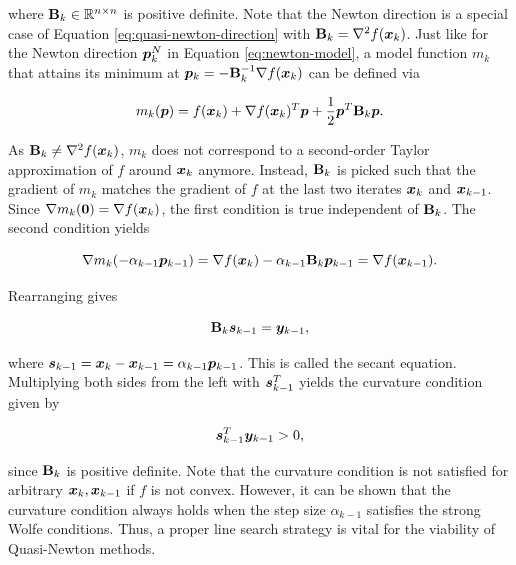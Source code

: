 \noindent where $\mathbf{B}_k \in \mathbb{R}^{n \times n}$ is positive definite. Note that the Newton direction is a special 
case of 
Equation \ref{eq:quasi-newton-direction} with $\mathbf{B}_k = \nabla^2 f(\bm{x}_k)$. Just like for the Newton direction $\bm{p}^N_k$ in
Equation \ref{eq:newton-model}, a model function $m_k$ 
that attains its minimum at $\bm{p}_k  = -\mathbf{B}^{-1}_k \nabla f(\bm{x}_k)$ can be defined via

\begin{equation}\label{eq:quasi-newton-model}
    m_k(\bm{p}) = f(\bm{x}_k)  + \nabla f(\bm{x}_k)^T \bm{p} + \frac{1}{2} \bm{p}^T\mathbf{B}_k\bm{p}.
\end{equation}

\noindent As $\mathbf{B}_k \neq \nabla^2 f(\bm{x}_k)$, $m_k$ does not correspond to a second-order Taylor approximation of $f$ around 
$\bm{x}_k$ anymore. Instead, $\mathbf{B}_k$ is picked such that the gradient of $m_k$ matches the gradient of $f$ at the last two iterates 
$\bm{x}_k$ and $\bm{x}_{k-1}$.
Since $\nabla m_{k}(\bm{0}) = \nabla f(\bm{x}_k)$, the first condition is true independent of $\mathbf{B}_k$. The 
second condition yields

\[
    \nabla m_{k}(-\alpha_{k-1}\bm{p}_{k-1}) = \nabla f(\bm{x}_k) - \alpha_{k-1}\mathbf{B}_{k}\bm{p}_{k-1} = \nabla f(\bm{x}_{k-1}).
\]

\noindent Rearranging gives

\begin{equation}\label{eq:secant-equation}
    \mathbf{B}_k \bm{s}_{k-1} = \bm{y}_{k-1},
\end{equation}

\noindent where $\bm{s}_{k-1} = \bm{x}_k - \bm{x}_{k-1} = \alpha_{k-1}\bm{p}_{k-1}$. This is called the secant equation. 
Multiplying both sides from the left with $\bm{s}_{k-1}^T$ yields the curvature condition given by

\begin{equation}\label{eq:curvature-condition}
    \bm{s}_{k-1}^T \bm{y}_{k-1} > 0,
\end{equation}

\noindent since $\mathbf{B}_k$ is positive definite. Note that the curvature condition is not satisfied for arbitrary $\bm{x}_k, \bm{x}_{k-1}$ 
if $f$ is 
not convex. However, it can be shown that the curvature condition always holds when the step size $\alpha_{k-1}$ satisfies the strong Wolfe 
conditions. Thus, a proper line search strategy is vital for the viability of Quasi-Newton methods.

